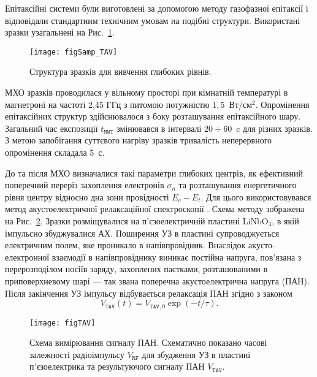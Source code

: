 \documentclass[a4paper,14pt,oneside,openany]{memoir}
\begin{document}
Епітаксійні системи були виготовлені за допомогою методу газофазної епітаксії і відповідали стандартним технічним умовам на подібні структури.
Використані зразки узагальнені на Рис.~\ref{figSamp_TAV}.

\begin{figure}
\center
\texttt{[image: figSamp\_TAV]}
\caption{\label{figSamp_TAV}
Структура зразків для вивчення глибоких рівнів.
}%
\end{figure}

МХО зразків проводилася у вільному просторі при кімнатній температурі в магнетроні на частоті 2,45 ГГц з питомою потужністю  $1,5$~Вт/см$^2$.
Опромінення епітаксійних структур здійснювалося з боку розташування епітаксійного шару.
Загальний час експозиції $t_\mathtt{MWT}$ змінювався в інтервалі $20\div60$~c для різних зразків.
З метою запобігання суттєвого нагріву зразків тривалість неперервного опромінення складала 5~с.

До та після МХО визначалися такі параметри глибоких центрів, як ефективний поперечний переріз захоплення електронів $\sigma_n$
та розташування енергетичного рівня центру відносно дна зони провідності $E_c-E_t$.
Для цього використовувався метод акустоелектричної релаксаційної спектроскопії \cite{Saiko1993,OstrovPAN,OlikhSSC}.
Схема методу зображена на Рис.~\ref{figTAV}.
Зразки розміщувалися на п'єзоелектричній пластині LiNbO$_3$, в якій імпульсно збуджувалися АХ.
Поширення УЗ в пластині супроводжується електричним полем, яке проникало в напівпровідник.
Внаслідок акусто--електронної взаємодії в напівпровіднику виникає постійна напруга, пов'язана з перерозподілом носіїв заряду,
захоплених пастками, розташованими в приповерхневому шарі --- так звана поперечна акустоелектрична напруга (ПАН).
Після закінчення УЗ імпульсу відбувається релаксація ПАН згідно з законом
\begin{equation}\label{eqVtav}
  V_\mathtt{TAV}(t)=V_{\mathtt{TAV},0}\exp(-t/\tau).
\end{equation}

\begin{figure}
\center
\texttt{[image: figTAV]}
\caption{\label{figTAV}
Схема вимірювання сигналу ПАН.
Схематично показано часові залежності радіоімпульсу $V_\mathtt{RF}$ для збудження УЗ в пластині п'єзоелектрика
та результуючого сигналу ПАН $V_\mathtt{TAV}$.
}%
\end{figure}
\end{document}
